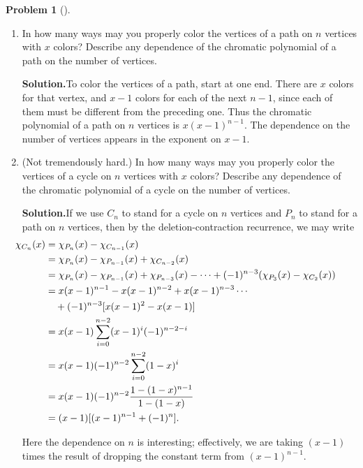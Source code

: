 \documentclass[10pt,]{book}
\theoremstyle{plain}
\theoremstyle{definition}
\newtheorem{activity}[project]{Problem}
\theoremstyle{definition}
\numberwithin{equation}{chapter}
\newcommand{\amp}{&}
\begin{document}
\begin{activity}[]\label{activity-245}
\leavevmode%
\begin{enumerate}[font=\bfseries,label=(\alph*),ref=\alph*]
\item\label{task-180} In how many ways may you properly color the vertices of a path on \(n\) vertices with \(x\) colors? Describe any dependence of the chromatic polynomial of a path on the number of vertices.%
\par\medskip\noindent%
\textbf{Solution.}\quad To color the vertices of a path, start at one end. There are \(x\) colors for that vertex, and \(x-1\) colors for each of the next \(n-1\), since each of them must be different from the preceding one. Thus the chromatic polynomial of a path on \(n\) vertices is \(x(x-1)^{n-1}\). The dependence on the number of vertices appears in the exponent on \(x-1\).%
\item\label{task-181} (Not tremendously hard.) In how many ways may you properly color the vertices of a cycle on \(n\) vertices with \(x\) colors? Describe any dependence of the chromatic polynomial of a cycle on the number of vertices.%
\par\medskip\noindent%
\textbf{Solution.}\quad If we use \(C_n\) to stand for a cycle on \(n\) vertices and \(P_n\) to stand for a path on \(n\) vertices, then by the deletion-contraction recurrence, we may write%
\begin{align*}
\hspace{-.4 in}\chi_{C_n}(x)  \amp =
\chi_{P_n}(x)-\chi_{C_{n-1}}(x)\\
\amp =  \chi_{P_n}(x)-\chi_{P_{n-1}}(x)+\chi_{C_{n-2}}(x)\\
\amp =
\chi_{P_n}(x)-\chi_{P_{n-1}}(x)+\chi_{P_{n-3}}(x)-
\cdots+(-1)^{n-3}(\chi_{P_3}(x)-\chi_{C_2}(x))\\
\amp =  x(x-1)^{n-1}-x(x-1)^{n-2}+x(x-1)^{n-3}\cdots\\
\amp \quad
+ (-1)^{n-3}[x(x-1)^2-x(x-1)]\\
\amp =  x(x-1)\sum_{i=0}^{n-2}(x-1)^i(-1)^{n-2-i}\\
\amp =  x(x-1)(-1)^{n-2}\sum_{i=0}^{n-2}(1-x)^i\\
\amp =  x(x-1)(-1)^{n-2}\frac{1-(1-x)^{n-1}}{1-(1-x)}\\
\amp =  (x-1)[(x-1)^{n-1}+(-1)^n].
\end{align*}
%
\par
Here the dependence on \(n\) is interesting; effectively, we are taking \((x-1)\) times the result of dropping the constant term from \((x-1)^{n-1}\).%
\end{enumerate}
\end{activity}
\end{document}
